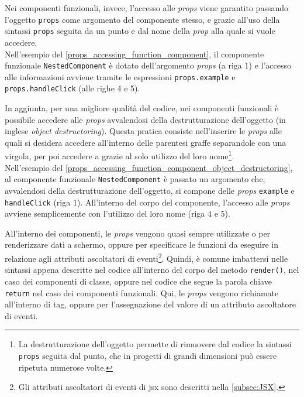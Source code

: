 Nei componenti funzionali, invece, l'accesso alle \textit{props} viene garantito passando l'oggetto \texttt{props} come argomento del componente stesso, e grazie all'uso della sintassi \texttt{props} seguita da un punto e dal nome della \textit{prop} alla quale si vuole accedere.\\
Nell'esempio del \autoref{props_accessing_function_component}, il componente funzionale \texttt{NestedComponent} è dotato dell'argomento \textit{props} (a riga 1) e l'accesso alle informazioni avviene tramite le espressioni \texttt{props.example} e \texttt{props.handleClick} (alle righe 4 e 5).



In aggiunta, per una migliore qualità del codice, nei componenti funzionali è possibile accedere alle \textit{props} avvalendosi della destrutturazione dell'oggetto (in inglese \textit{object destructoring}). Questa pratica consiste nell'inserire le \textit{props} alle quali si desidera accedere all'interno delle parentesi graffe separandole con una virgola, per poi accedere a grazie al solo utilizzo del loro nome\footnote{La destrutturazione dell'oggetto permette di rimuovere dal codice la sintassi \texttt{props} seguita dal punto, che in progetti di grandi dimensioni può essere ripetuta numerose volte.}.\\
Nell'esempio del \autoref{props_accessing_function_component_object_destructoring}, al componente funzionale \texttt{NestedComponent} è passato un argomento che, avvalendosi della destrutturazione dell'oggetto, si compone delle \textit{props} \texttt{example} e \texttt{handleClick} (riga 1). All'interno del corpo del componente, l'accesso alle \textit{props} avviene semplicemente con l'utilizzo del loro nome (riga 4 e 5).



All'interno dei componenti, le  \textit{props} vengono quasi sempre utilizzate o per renderizzare dati a schermo, oppure per specificare le funzioni da eseguire in relazione agli attributi ascoltatori di eventi\footnote{Gli attributi ascoltatori di eventi di \acrshort{jsx} sono descritti nella \autoref{subsec:JSX}.}. Quindi, è comune imbattersi nelle sintassi appena descritte nel codice all'interno del corpo del metodo \texttt{render()}, nel caso dei componenti di classe, oppure nel codice che segue la parola chiave \texttt{return} nel caso dei componenti funzionali. Qui, le \textit{props} vengono richiamate all'interno di tag, oppure per l'assegnazione del valore di un attributo ascoltatore di eventi.

